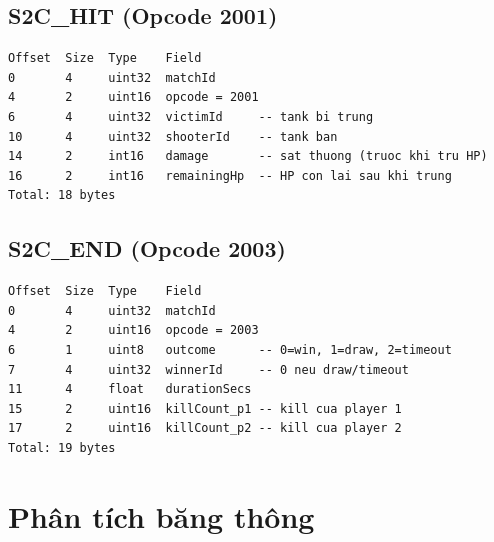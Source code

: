 \documentclass[12pt,a4paper]{report}
\begin{document}
\subsection{S2C\_HIT (Opcode 2001)}

\begin{lstlisting}[style=bashStyle, caption={Layout S2C\_HIT --- thông báo trúng đạn}, label={lst:s2chit}]
Offset  Size  Type    Field
0       4     uint32  matchId
4       2     uint16  opcode = 2001
6       4     uint32  victimId     -- tank bi trung
10      4     uint32  shooterId    -- tank ban
14      2     int16   damage       -- sat thuong (truoc khi tru HP)
16      2     int16   remainingHp  -- HP con lai sau khi trung
Total: 18 bytes
\end{lstlisting}

\subsection{S2C\_END (Opcode 2003)}

\begin{lstlisting}[style=bashStyle, caption={Layout S2C\_END --- thông báo kết thúc trận}, label={lst:s2cend}]
Offset  Size  Type    Field
0       4     uint32  matchId
4       2     uint16  opcode = 2003
6       1     uint8   outcome      -- 0=win, 1=draw, 2=timeout
7       4     uint32  winnerId     -- 0 neu draw/timeout
11      4     float   durationSecs
15      2     uint16  killCount_p1 -- kill cua player 1
17      2     uint16  killCount_p2 -- kill cua player 2
Total: 19 bytes
\end{lstlisting}

\section{Phân tích băng thông}
\end{document}
